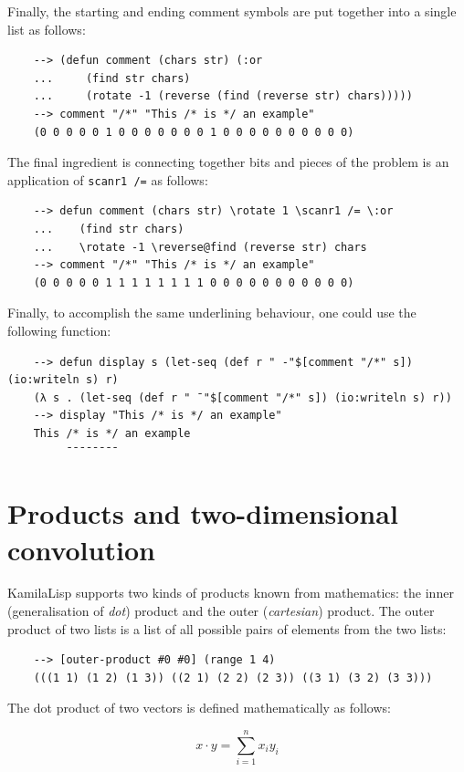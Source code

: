 Finally, the starting and ending comment symbols are put together into a single list as follows:

\begin{Verbatim}
    --> (defun comment (chars str) (:or
    ...     (find str chars)
    ...     (rotate -1 (reverse (find (reverse str) chars)))))
    --> comment "/*" "This /* is */ an example"
    (0 0 0 0 0 1 0 0 0 0 0 0 0 1 0 0 0 0 0 0 0 0 0 0)
\end{Verbatim}

The final ingredient is connecting together bits and pieces of the problem is an application of \verb|scanr1 /=| as follows:

\begin{Verbatim}
    --> defun comment (chars str) \rotate 1 \scanr1 /= \:or
    ...    (find str chars)
    ...    \rotate -1 \reverse@find (reverse str) chars
    --> comment "/*" "This /* is */ an example"
    (0 0 0 0 0 1 1 1 1 1 1 1 1 0 0 0 0 0 0 0 0 0 0 0)
\end{Verbatim}

Finally, to accomplish the same underlining behaviour, one could use the following function:

\begin{Verbatim}
    --> defun display s (let-seq (def r " -"$[comment "/*" s]) (io:writeln s) r)
    (λ s . (let-seq (def r " ¯"$[comment "/*" s]) (io:writeln s) r))
    --> display "This /* is */ an example"
    This /* is */ an example
         ¯¯¯¯¯¯¯¯
\end{Verbatim}

\section{Products and two-dimensional convolution}

KamilaLisp supports two kinds of products known from mathematics: the inner (generalisation of \textit{dot}) product and the outer (\textit{cartesian}) product. The outer product of two lists is a list of all possible pairs of elements from the two lists:

\begin{Verbatim}
    --> [outer-product #0 #0] (range 1 4)
    (((1 1) (1 2) (1 3)) ((2 1) (2 2) (2 3)) ((3 1) (3 2) (3 3)))
\end{Verbatim}

The dot product of two vectors is defined mathematically as follows:

$$
{\displaystyle x \cdot y = \sum_{i=1}^{n}x_{i}y_{i}}
$$


